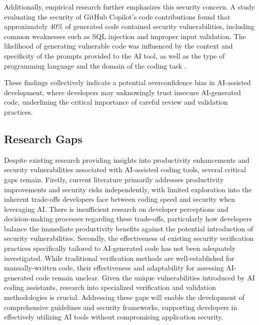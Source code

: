 Additionally, empirical research further emphasizes this security concern. A study evaluating the security of GitHub Copilot’s code contributions found that approximately 40\% of generated code contained security vulnerabilities, including common weaknesses such as SQL injection and improper input validation. The likelihood of generating vulnerable code was influenced by the context and specificity of the prompts provided to the AI tool, as well as the type of programming language and the domain of the coding task \cite{pearce2021asleep}.

These findings collectively indicate a potential overconfidence bias in AI-assisted development, where developers may unknowingly trust insecure AI-generated code, underlining the critical importance of careful review and validation practices.

\subsection{Research Gaps}
Despite existing research providing insights into productivity enhancements and security vulnerabilities associated with AI-assisted coding tools, several critical gaps remain.
Firstly, current literature primarily addresses productivity improvements and security risks independently, with limited exploration into the inherent trade-offs developers face between coding speed and security when leveraging AI. There is insufficient research on developer perceptions and decision-making processes regarding these trade-offs, particularly how developers balance the immediate productivity benefits against the potential introduction of security vulnerabilities.
Secondly, the effectiveness of existing security verification practices specifically tailored to AI-generated code has not been adequately investigated. While traditional verification methods are well-established for manually-written code, their effectiveness and adaptability for assessing AI-generated code remain unclear. Given the unique vulnerabilities introduced by AI coding assistants, research into specialized verification and validation methodologies is crucial.
Addressing these gaps will enable the development of comprehensive guidelines and security frameworks, supporting developers in effectively utilizing AI tools without compromising application security.
